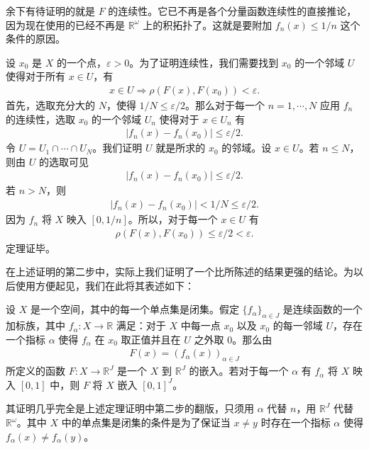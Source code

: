 余下有待证明的就是 $F$ 的连续性。它已不再是各个分量函数连续性的直接推论，因为现在使用的已经不再是 $\mathbb{R}^{\omega}$ 上的积拓扑了。这就是要附加 $f_{n}(x)\leqslant 1/n$ 这个条件的原因。

设 $x_{0}$ 是 $X$ 的一个点，$\varepsilon>0$。为了证明连续性，我们需要找到 $x_{0}$ 的一个邻域 $U$ 使得对于所有 $x\in U$，有
\begin{align*}
x\in U\Longrightarrow\rho(F(x),F(x_{0}))<\varepsilon.
\end{align*}
首先，选取充分大的 $N$，使得 $1/N\leqslant\varepsilon/2$。那么对于每一个 $n=1,\cdots,N$ 应用 $f_{n}$ 的连续性，选取 $x_{0}$ 的一个邻域 $U_{n}$ 使得对于 $x\in U_{n}$ 有
\begin{align*}
|f_{n}(x)-f_{n}(x_{0})|\leqslant\varepsilon/2.
\end{align*}
令 $U=U_{1}\cap\cdots\cap U_{N}$。我们证明 $U$ 就是所求的 $x_{0}$ 的邻域。设 $x\in U$。若 $n\leqslant N$，则由 $U$ 的选取可见
\begin{align*}
|f_{n}(x)-f_{n}(x_{0})|\leqslant\varepsilon/2.
\end{align*}
若 $n>N$，则
\begin{align*}
|f_{n}(x)-f_{n}(x_{0})|<1/N\leqslant\varepsilon/2.
\end{align*}
因为 $f_{n}$ 将 $X$ 映入 $[0,1/n]$。所以，对于每一个 $x\in U$ 有
\begin{align*}
\rho(F(x),F(x_{0}))\leqslant\varepsilon/2<\varepsilon.
\end{align*}
定理证毕。

在上述证明的第二步中，实际上我们证明了一个比所陈述的结果更强的结论。为以后使用方便起见，我们在此将其表述如下：

\begin{theorem}[嵌入定理]\label{theorem:ch04-embedding}
设 $X$ 是一个空间，其中的每一个单点集是闭集。假定 $\{f_{\alpha}\}_{\alpha\in J}$ 是连续函数的一个加标族，其中 $f_{\alpha}\colon X\to\mathbb{R}$ 满足：对于 $X$ 中每一点 $x_{0}$ 以及 $x_{0}$ 的每一邻域 $U$，存在一个指标 $\alpha$ 使得 $f_{\alpha}$ 在 $x_{0}$ 取正值并且在 $U$ 之外取 $0$。那么由
\begin{align*}
F(x)=(f_{\alpha}(x))_{\alpha\in J}
\end{align*}
所定义的函数 $F\colon X\to\mathbb{R}^{J}$ 是一个 $X$ 到 $\mathbb{R}^{J}$ 的嵌入。若对于每一个 $\alpha$ 有 $f_{\alpha}$ 将 $X$ 映入 $[0,1]$ 中，则 $F$ 将 $X$ 嵌入 $[0,1]^{J}$。
\end{theorem}

其证明几乎完全是上述定理证明中第二步的翻版，只须用 $\alpha$ 代替 $n$，用 $\mathbb{R}^{J}$ 代替 $\mathbb{R}^{\omega}$。其中 $X$ 中的单点集是闭集的条件是为了保证当 $x\neq y$ 时存在一个指标 $\alpha$ 使得 $f_{\alpha}(x)\neq f_{\alpha}(y)$。

